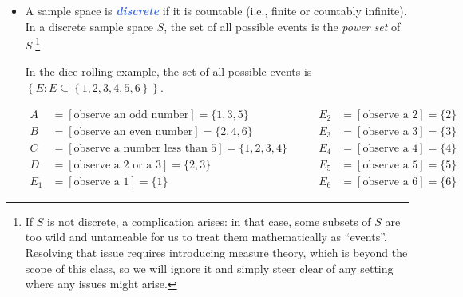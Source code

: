 \documentclass[10pt]{article}
\theoremstyle{definition}
\newcommand{\1}[1]{\textbf{1}_{\left[#1\right]}} %
\newcommand{\demph}[1]{\textcolor{RoyalBlue}{\textbf{\slshape #1}}} %
\begin{document}
\begin{itemize}
  In the above example, the events $A,B,C$ and $D$ are compound events. $E_{1},\ldots,E_{6}$ are simple events.

  \item A sample space is \demph{discrete} if it is countable (i.e., finite or
  countably infinite). In a discrete sample space $S$, the set of all possible
  events is the \textit{power set} of $S$.\footnote{If $S$ is not discrete, a
    complication arises: in that case, some subsets of $S$ are too wild and
    untameable for us to treat them mathematically as ``events''. Resolving
    that issue requires introducing measure theory, which is beyond the scope
    of this class, so we will ignore it and simply steer clear of any setting
    where any issues might arise.}

  In the dice-rolling example, the set of all possible events is
  $\left\{E: E\subseteq \left\{1,2,3,4,5,6\right\} \right\}$. 

  
  \begin{equation*}
    \begin{aligned}
      A &= [\text{observe an odd number}] = \{1,3,5\} \\
      B &= [\text{observe an even number}] = \{2,4,6\} \\
      C &= [\text{observe a number less than 5}] = \{1,2,3,4\} \\
      D &= [\text{observe a 2 or a 3}] = \{2,3\}\\
      E_1 &= [\text{observe a 1}] = \{1\}
    \end{aligned}
    \qquad
    \begin{aligned}
      E_2 &= [\text{observe a 2}] = \{2\} \\
      E_3 &= [\text{observe a 3}] = \{3\} \\
      E_4 &= [\text{observe a 4}] = \{4\} \\
      E_5 &= [\text{observe a 5}] = \{5\} \\
      E_6 &= [\text{observe a 6}] = \{6\}
    \end{aligned}
  \end{equation*}


\end{itemize}
\end{document}
